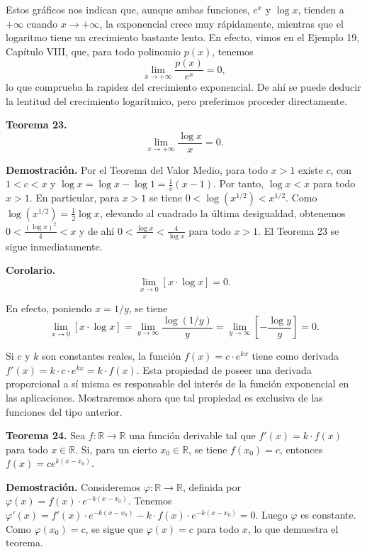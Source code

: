 \documentclass[12pt,oneside]{book}
\begin{document}
Estos gráficos nos indican que, aunque ambas funciones, \(e^x\) y \(\log x\), tienden a \(+\infty\) cuando \(x \to +\infty\), la exponencial crece muy rápidamente, mientras que el logaritmo tiene un crecimiento bastante lento. En efecto, vimos en el Ejemplo 19, Capítulo VIII, que, para todo polinomio \(p(x)\), tenemos
\[
\lim_{x \to +\infty} \frac{p(x)}{e^x} = 0,
\]
lo que comprueba la rapidez del crecimiento exponencial. De ahí se puede deducir la lentitud del crecimiento logarítmico, pero preferimos proceder directamente.

\textbf{Teorema 23.}
\[
\lim_{x \to +\infty} \frac{\log x}{x} = 0.
\]

\textbf{Demostración.} Por el Teorema del Valor Medio, para todo \(x > 1\) existe \(c\), con \(1 < c < x\) y \(\log x = \log x - \log 1 = \frac{1}{c}(x - 1)\). Por tanto, \(\log x < x\) para todo \(x > 1\). En particular, para \(x > 1\) se tiene \(0 < \log(x^{1/2}) < x^{1/2}\). Como \(\log(x^{1/2}) = \frac{1}{2}\log x\), elevando al cuadrado la última desigualdad, obtenemos \(0 < \frac{(\log x)^2}{4} < x\) y de ahí \(0 < \frac{\log x}{x} < \frac{4}{\log x}\) para todo \(x > 1\). El Teorema 23 se sigue inmediatamente.

\textbf{Corolario.}
\[
\lim_{x \to 0} [x \cdot \log x] = 0.
\]

En efecto, poniendo \(x = 1/y\), se tiene
\[
\lim_{x \to 0} [x \cdot \log x] = \lim_{y \to \infty} \frac{\log(1/y)}{y} = \lim_{y \to \infty} \left[ -\frac{\log y}{y} \right] = 0.
\]

Si \(c\) y \(k\) son constantes reales, la función \(f(x) = c \cdot e^{kx}\) tiene como derivada \(f'(x) = k \cdot c \cdot e^{kx} = k \cdot f(x)\). Esta propiedad de poseer una derivada proporcional a sí misma es responsable del interés de la función exponencial en las aplicaciones. Mostraremos ahora que tal propiedad es exclusiva de las funciones del tipo anterior.

\textbf{Teorema 24.} Sea \(f: \mathbb{R} \to \mathbb{R}\) una función derivable tal que \(f'(x) = k \cdot f(x)\) para todo \(x \in \mathbb{R}\). Si, para un cierto \(x_0 \in \mathbb{R}\), se tiene \(f(x_0) = c\), entonces \(f(x) = c e^{k(x-x_0)}\).

\textbf{Demostración.} Consideremos \(\varphi: \mathbb{R} \to \mathbb{R}\), definida por \(\varphi(x) = f(x) \cdot e^{-k(x-x_0)}\). Tenemos \(\varphi'(x) = f'(x) \cdot e^{-k(x-x_0)} - k \cdot f(x) \cdot e^{-k(x-x_0)} = 0\). Luego \(\varphi\) es constante. Como \(\varphi(x_0) = c\), se sigue que \(\varphi(x) = c\) para todo \(x\), lo que demuestra el teorema.
\end{document}
